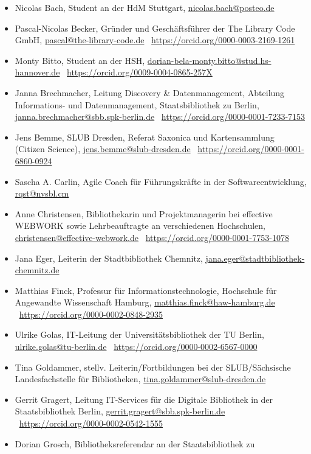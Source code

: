 \documentclass[
  11pt,
  letterpaper,
  DIV=11,
  twoside]{scrreprt}
\begin{document}
\begin{itemize}
\item
  Nicolas Bach, Student an der HdM Stuttgart,
  \url{nicolas.bach@posteo.de}
\item
  Pascal-Nicolas Becker, Gründer und Geschäftsführer der The Library
  Code GmbH, \url{pascal@the-library-code.de}
  \orcidlogo~\url{https://orcid.org/0000-0003-2169-1261}
\item
  Monty Bitto, Student an der HSH,
  \url{dorian-bela-monty.bitto@stud.hs-hannover.de}
  \orcidlogo~\url{https://orcid.org/0009-0004-0865-257X}
\item
  Janna Brechmacher, Leitung Discovery \& Datenmanagement, Abteilung
  Informations- und Datenmanagement, Staatsbibliothek zu Berlin,
  \url{janna.brechmacher@sbb.spk-berlin.de}
  \orcidlogo~\url{https://orcid.org/0000-0001-7233-7153}
\item
  Jens Bemme, SLUB Dresden, Referat Saxonica und Kartensammlung (Citizen
  Science), \url{jens.bemme@slub-dresden.de}
  \orcidlogo~\url{https://orcid.org/0000-0001-6860-0924}
\item
  Sascha A. Carlin, Agile Coach für Führungskräfte in der
  Softwareentwicklung, \url{rqst@nvsbl.cm}
\item
  Anne Christensen, Bibliothekarin und Projektmanagerin bei effective
  WEBWORK sowie Lehrbeauftragte an verschiedenen Hochschulen,
  \url{christensen@effective-webwork.de}
  \orcidlogo~\url{https://orcid.org/0000-0001-7753-1078}
\item
  Jana Eger, Leiterin der Stadtbibliothek Chemnitz,
  \url{jana.eger@stadtbibliothek-chemnitz.de}
\item
  Matthias Finck, Professur für Informationstechnologie, Hochschule für
  Angewandte Wissenschaft Hamburg, \url{matthias.finck@haw-hamburg.de}
  \orcidlogo~\url{https://orcid.org/0000-0002-0848-2935}
\item
  Ulrike Golas, IT-Leitung der Universitätsbibliothek der TU Berlin,
  \url{ulrike.golas@tu-berlin.de}
  \orcidlogo~\url{https://orcid.org/0000-0002-6567-0000}
\item
  Tina Goldammer, stellv. Leiterin/Fortbildungen bei der SLUB/Sächsische
  Landesfachstelle für Bibliotheken,
  \url{tina.goldammer@slub-dresden.de}
\item
  Gerrit Gragert, Leitung IT-Services für die Digitale Bibliothek in der
  Staatsbibliothek Berlin, \url{gerrit.gragert@sbb.spk-berlin.de}
  \orcidlogo~\url{https://orcid.org/0000-0002-0542-1555}
\item
  Dorian Grosch, Bibliotheksreferendar an der Staatsbibliothek zu

\end{itemize}
\end{document}
